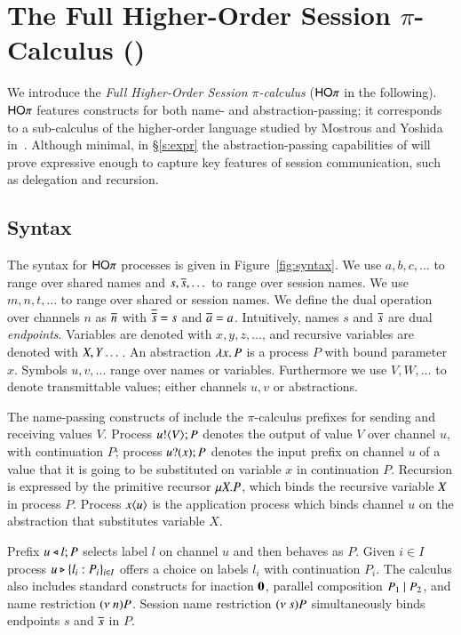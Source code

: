 
\section{The Full Higher-Order Session $\pi$-Calculus (\HOp)}
\label{sec:calculus}

We introduce the {\em Full Higher-Order Session $\pi$-calculus}
($\mathsf{HO}\pi$ in the following).
$\mathsf{HO}\pi$ features constructs for both name- and abstraction-passing;
it corresponds to a sub-calculus 
of the higher-order language studied by Mostrous and Yoshida in~\cite{tlca07}.
Although minimal, in \S\ref{s:expr}
the abstraction-passing capabilities of \HOp will prove 
expressive enough to capture key features of session communication, 
such as delegation and recursion.

\subsection{Syntax}

The syntax for $\mathsf{HO}\pi$ processes is given in Figure~\ref{fig:syntax}.
We use $a,b,c, \dots$ to range over shared names and
$s, \overline{s}, \dots$ to range over session names.
We use $m, n, t, \dots$ to range over shared or session names.
We define the dual operation over channels $n$ as $\overline{n}$ with
$\overline{\overline{s}} = s$ and $\overline{a} = a$.
Intuitively, names $s$ and $\overline{s}$ are dual \emph{endpoints}.
Variables are denoted with $x, y, z, \dots$, 
and recursive variables are denoted with $X, Y \dots$.
An abstraction $\lambda x.\,P$ is a process $P$ with bound parameter $x$.
Symbols $u, v, \dots$ range over names or variables. Furthermore
we use $V, W, \dots$ to denote transmittable values; either channels $u, v$ or
abstractions.

The name-passing constructs of \HOp include the
$\pi$-calculus prefixes for sending and receiving values $V$.
Process $u ! \langle V \rangle ; P$ denotes the output of value $V$
over channel $u$, with continuation $P$;
process $u ? (x) ; P$ denotes the input prefix on channel $u$ of a value
that it is going to be substituted on variable $x$ in continuation $P$. 
Recursion is expressed by the primitive recursor $\mu X. P$,
which binds the recursive variable $X$ in process $P$.
Process $x\langle u \rangle$ is the application
process which binds channel $u$ on the abstraction that
substitutes variable $X$.

Prefix $u \triangleleft l ; P$ selects label $l$ on channel $u$ and then behaves as $P$.
Given $i \in I$ process $u \triangleright \{l_i: P_i\}_{i \in I}$ offers a choice on labels $l_i$ with
continuation $P_i$.
The calculus also includes standard constructs for 
inaction $\mathbf{0}$,  parallel composition $P_1 \;|\; P_2$, and 
name restriction $(\nu\ n) P$.
Session name restriction $(\nu\ s) P$ simultaneously binds endpoints $s$ and $\overline{s}$ in $P$.

